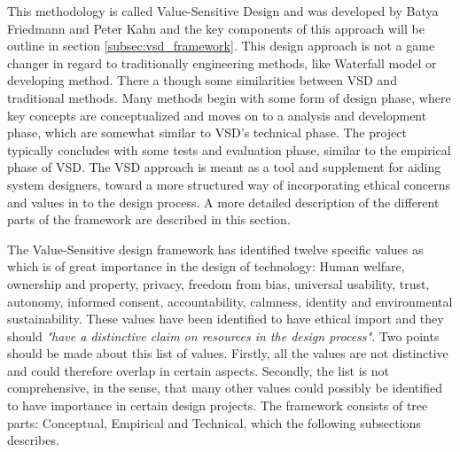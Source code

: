 This methodology is called Value-Sensitive Design and was developed by Batya Friedmann and Peter Kahn and the key components of this approach will be outline in section \ref{subsec:vsd_framework}.\newline
This design approach is not a game changer in regard to traditionally engineering methods, like Waterfall model or developing method. There a though some similarities between VSD and traditional methods. Many methods begin with some form of design phase, where key concepts are conceptualized and moves on to a analysis and development phase, which are somewhat similar to VSD's technical phase. The project typically concludes with some tests and evaluation phase, similar to the empirical phase of VSD\citep[p. 704]{IntegratingEthicsCummings}.\newline
The VSD approach is meant as a tool and supplement for aiding system designers, toward a more structured way of incorporating ethical concerns and values in to the design process.\newline 
A more detailed description of the different parts of the framework are described in this section.\newline

The Value-Sensitive design framework has identified twelve specific values as which is of great importance in the design of technology: Human welfare, ownership and property, privacy, freedom from bias, universal usability, trust, autonomy, informed consent, accountability, calmness, identity and environmental sustainability. These values have been identified to have ethical import and they should \textit{"have a distinctive claim on resources in the design process"}\citep[p. 1187]{HumanValuesEthicsAndDesign}. Two points should be made about this list of values. Firstly, all the values are not distinctive and could therefore overlap in certain aspects. Secondly, the list is not comprehensive, in the sense, that many other values could possibly be identified to have importance in certain design projects.\newline 
The framework consists of tree parts: Conceptual, Empirical and Technical, which the following subsections describes. 

